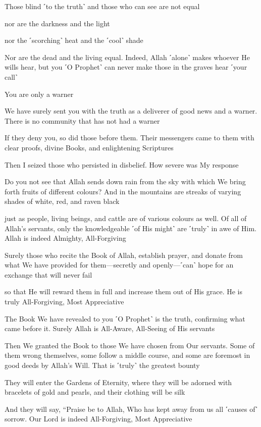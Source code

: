 Those blind ˹to the truth˺ and those who can see are not equal

nor are the darkness and the light

nor the ˹scorching˺ heat and the ˹cool˺ shade

Nor are the dead and the living equal. Indeed, Allah ˹alone˺ makes whoever He wills hear, but you ˹O Prophet˺ can never make those in the graves hear ˹your call˺

You are only a warner

We have surely sent you with the truth as a deliverer of good news and a warner. There is no community that has not had a warner

If they deny you, so did those before them. Their messengers came to them with clear proofs, divine Books, and enlightening Scriptures

Then I seized those who persisted in disbelief. How severe was My response

Do you not see that Allah sends down rain from the sky with which We bring forth fruits of different colours? And in the mountains are streaks of varying shades of white, red, and raven black

just as people, living beings, and cattle are of various colours as well. Of all of Allah’s servants, only the knowledgeable ˹of His might˺ are ˹truly˺ in awe of Him. Allah is indeed Almighty, All-Forgiving

Surely those who recite the Book of Allah, establish prayer, and donate from what We have provided for them—secretly and openly—˹can˺ hope for an exchange that will never fail

so that He will reward them in full and increase them out of His grace. He is truly All-Forgiving, Most Appreciative

The Book We have revealed to you ˹O Prophet˺ is the truth, confirming what came before it. Surely Allah is All-Aware, All-Seeing of His servants

Then We granted the Book to those We have chosen from Our servants. Some of them wrong themselves, some follow a middle course, and some are foremost in good deeds by Allah’s Will. That is ˹truly˺ the greatest bounty

They will enter the Gardens of Eternity, where they will be adorned with bracelets of gold and pearls, and their clothing will be silk

And they will say, “Praise be to Allah, Who has kept away from us all ˹causes of˺ sorrow. Our Lord is indeed All-Forgiving, Most Appreciative

